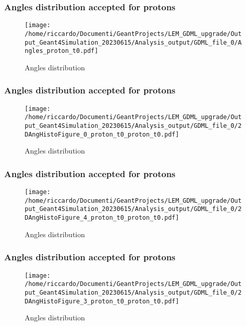 \documentclass[8pt]{beamer}
\begin{document}
        \begin{frame}
            \frametitle{Angles distribution accepted for protons}
        
        \begin{figure}[h]
            \centering
            \texttt{[image: /home/riccardo/Documenti/GeantProjects/LEM\_GDML\_upgrade/Output\_Geant4Simulation\_20230615/Analysis\_output/GDML\_file\_0/Angles\_proton\_t0.pdf]}
            \caption{Angles distribution}
        \end{figure}
        
        \end{frame}
        
        \begin{frame}
            \frametitle{Angles distribution accepted for protons}
        
        \begin{figure}[h]
            \centering
            \texttt{[image: /home/riccardo/Documenti/GeantProjects/LEM\_GDML\_upgrade/Output\_Geant4Simulation\_20230615/Analysis\_output/GDML\_file\_0/2DAngHistoFigure\_0\_proton\_t0\_proton\_t0.pdf]}
            \caption{Angles distribution}
        \end{figure}
        
        \end{frame}
        
        \begin{frame}
            \frametitle{Angles distribution accepted for protons}
        
        \begin{figure}[h]
            \centering
            \texttt{[image: /home/riccardo/Documenti/GeantProjects/LEM\_GDML\_upgrade/Output\_Geant4Simulation\_20230615/Analysis\_output/GDML\_file\_0/2DAngHistoFigure\_4\_proton\_t0\_proton\_t0.pdf]}
            \caption{Angles distribution}
        \end{figure}
        
        \end{frame}
        
        \begin{frame}
            \frametitle{Angles distribution accepted for protons}
        
        \begin{figure}[h]
            \centering
            \texttt{[image: /home/riccardo/Documenti/GeantProjects/LEM\_GDML\_upgrade/Output\_Geant4Simulation\_20230615/Analysis\_output/GDML\_file\_0/2DAngHistoFigure\_3\_proton\_t0\_proton\_t0.pdf]}
            \caption{Angles distribution}
        \end{figure}
        
        \end{frame}
        
\end{document}
